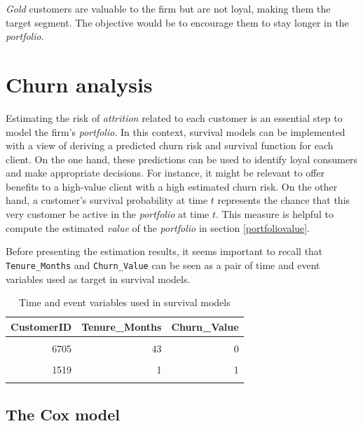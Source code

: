 \documentclass[
]{book}
\begin{document}
\emph{Gold} customers are valuable to the firm but are not loyal, making them the target segment. The objective would be to encourage them to stay longer in the \emph{portfolio}.

\hypertarget{churnAnalysis}{%
\section{Churn analysis}\label{churnAnalysis}}

Estimating the risk of \emph{attrition} related to each customer is an essential step to model the firm's \emph{portfolio}. In this context, survival models can be implemented with a view of deriving a predicted churn risk and survival function for each client. On the one hand, these predictions can be used to identify loyal consumers and make appropriate decisions. For instance, it might be relevant to offer benefits to a high-value client with a high estimated churn risk. On the other hand, a customer's survival probability at time \(t\) represents the chance that this very customer be active in the \emph{portfolio} at time \(t\). This measure is helpful to compute the estimated \emph{value} of the \emph{portfolio} in section \ref{portfoliovalue}.

Before presenting the estimation results, it seems important to recall that \texttt{Tenure\_Months} and \texttt{Churn\_Value} can be seen as a pair of time and event variables used as target in survival models.

\begin{table}[H]

\caption{\label{tab:survtarget}Time and event variables used in survival models}
\centering
\begin{tabular}[t]{rrr}
\toprule
CustomerID & Tenure\_Months & Churn\_Value\\
\midrule
\cellcolor{gray!6}{1671} & \cellcolor{gray!6}{30} & \cellcolor{gray!6}{1}\\
6705 & 43 & 0\\
\cellcolor{gray!6}{3702} & \cellcolor{gray!6}{12} & \cellcolor{gray!6}{0}\\
1519 & 1 & 1\\
\cellcolor{gray!6}{4882} & \cellcolor{gray!6}{50} & \cellcolor{gray!6}{0}\\
\bottomrule
\end{tabular}
\end{table}

\hypertarget{coxmodel}{%
\subsection{The Cox model}\label{coxmodel}}
\end{document}
